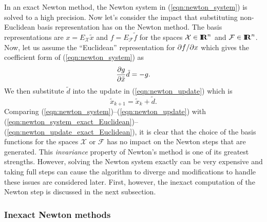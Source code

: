 \documentclass[pdf,ps2pdf,11pt]{SANDreport}
\begin{document}
In an exact Newton method, the Newton system in (\ref{eqn:newton_system}) is
solved to a high precision.  Now let's consider the impact that substituting
non-Euclidean basis representation has on the Newton method.  The basis
representations are $x = E_{\mathcal{X}}\tilde{x}$ and $f =
E_{\mathcal{F}}\tilde{f}$ for the spaces $\mathcal{X}\in\mbox{\textbf{I}}\hspace{-0.6ex}\mbox{\textbf{R}}^n$ and
$\mathcal{F}\in\mbox{\textbf{I}}\hspace{-0.6ex}\mbox{\textbf{R}}^n$.  Now, let us assume the ``Euclidean'' representation
for $\partial f / \partial x$ which gives the coefficient form of (\ref{eqn:newton_system})
as
%
\begin{equation}
\displaystyle{\frac{\partial g}{\partial \tilde{x}}} \tilde{d} =  - g.
\label{eqn:newton_system_exact_Euclidean}
\end{equation}
%
We then substitute $\tilde d$ into the update in (\ref{eqn:newton_update})
which is
%
\begin{equation}
\tilde{x}_{k+1} = \tilde{x}_k + \tilde{d}.
\label{eqn:newton_update_exact_Euclidean}
\end{equation}
%
Comparing (\ref{eqn:newton_system})--(\ref{eqn:newton_update}) with
(\ref{eqn:newton_system_exact_Euclidean})--(\ref{eqn:newton_update_exact_Euclidean}),
it is clear that the choice of the basis functions for the spaces
$\mathcal{X}$ or $\mathcal{F}$ has no impact on the Newton steps that are
generated.  This {}\textit{invariance} property of Newton's method is one of
its greatest strengths.  However, solving the Newton system exactly can be
very expensive and taking full steps can cause the algorithm to diverge and
modifications to handle these issues are considered later.  First, however,
the inexact computation of the Newton step is discussed in the next
subsection.

\subsubsection{Inexact Newton methods}
\end{document}
